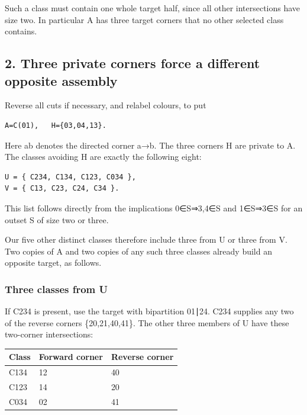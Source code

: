 \documentclass[
  10pt,
]{article}
\begin{document}
Such a class must contain one whole target half, since all other
intersections have size two. In particular A has three target corners
that no other selected class contains.

\hypertarget{three-private-corners-force-a-different-opposite-assembly}{%
\subsection*{2. Three private corners force a different opposite
assembly}\label{three-private-corners-force-a-different-opposite-assembly}}

Reverse all cuts if necessary, and relabel colours, to put

\begin{verbatim}
A=C(01),   H={03,04,13}.
\end{verbatim}

Here ab denotes the directed corner a→b. The three corners H are private
to A. The classes avoiding H are exactly the following eight:

\begin{verbatim}
U = { C234, C134, C123, C034 },
V = { C13, C23, C24, C34 }.
\end{verbatim}

This list follows directly from the implications 0∈S⇒3,4∈S and 1∈S⇒3∈S
for an outset S of size two or three.

Our five other distinct classes therefore include three from U or three
from V. Two copies of A and two copies of any such three classes already
build an opposite target, as follows.

\hypertarget{three-classes-from-u}{%
\subsubsection*{Three classes from U}\label{three-classes-from-u}}

If C234 is present, use the target with bipartition 01∣24. C234 supplies
any two of the reverse corners \{20,21,40,41\}. The other three members
of U have these two-corner intersections:

\begin{longtable}[]{@{}lll@{}}
\toprule\noalign{}
Class & Forward corner & Reverse corner \\
\midrule\noalign{}
\endhead
\bottomrule\noalign{}
\endlastfoot
C134 & 12 & 40 \\
C123 & 14 & 20 \\
C034 & 02 & 41 \\
\end{longtable}
\end{document}

